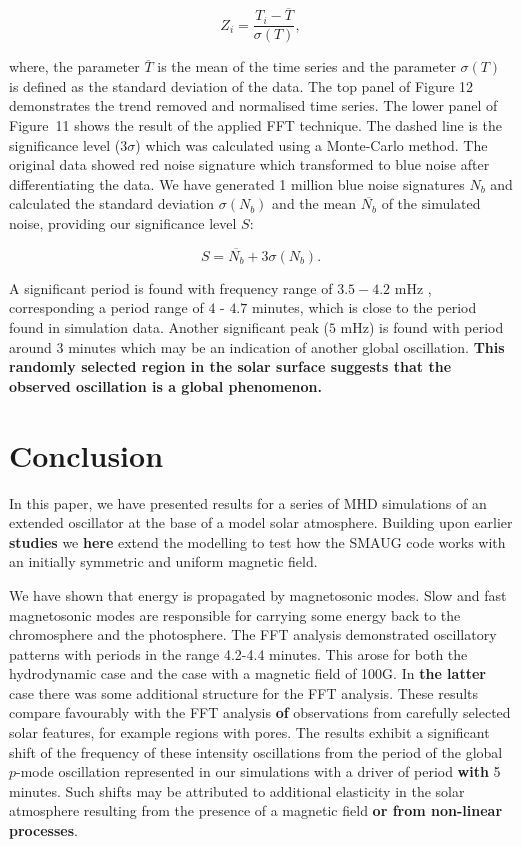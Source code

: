 \documentclass[physics,article,submit,pdftex,moreauthors]{Definitions/mdpi}
\begin{document}
\begin{equation}
	Z_{i} = \frac {T_{i} - \overline{T}}  {\sigma(T)},
	\label{z_score}
\end{equation}


where, the parameter $\overline{T}$ is the mean of the time series and the parameter $\sigma(T)$ is defined as the standard deviation of the data. The top panel of Figure 12 demonstrates the trend removed and normalised time series. The lower panel of Figure~11 shows the result of the applied FFT technique. The dashed line is the significance level ($3 \sigma$) which was calculated using a Monte-Carlo method. The original data showed red noise signature which transformed to blue noise after differentiating the data. We have generated 1 million blue noise signatures $N_{b}$ and calculated the standard deviation $\sigma(N_{b})$ and the mean $\overline{N_{b}}$ of the simulated noise, providing our significance level $S$:


\begin{equation}
    S = \overline{N_{b}} + 3 \sigma(N_{b}).
\end{equation}


A significant period is found with frequency range of $3.5-4.2$ mHz , corresponding a period range of $4$ - $4.7$ minutes, which is close to the period found in simulation data. Another significant peak ($5$ mHz) is found with period around $3$ minutes which may be an indication of another global oscillation. {\bf This randomly selected region in the solar surface suggests that the observed oscillation is a global phenomenon.}


\section{Conclusion}

In this paper, we have presented results for a series of MHD simulations of an extended oscillator at the base of a model solar atmosphere. Building upon earlier {\bf studies} we {\bf here} extend the modelling to test how the SMAUG code works with an initially symmetric and uniform magnetic field.

We have shown that energy is propagated by magnetosonic modes. Slow and fast magnetosonic modes are responsible for carrying some energy back to the chromosphere and the photosphere. 
The FFT analysis demonstrated oscillatory patterns with periods in the range 4.2-4.4 minutes. This arose for both the hydrodynamic case and the case with a magnetic field of 100G. In {\bf the latter} case there was some additional structure for the FFT analysis. These results compare favourably with the FFT analysis {\bf of} observations from carefully selected solar features, for example regions with pores. The results exhibit a significant shift of the frequency of these intensity oscillations from the period of the global $p$-mode oscillation represented in our simulations with a driver of period {\bf with} 5 minutes. Such shifts may be attributed to additional elasticity in the solar atmosphere resulting from the presence of a magnetic field {\bf or from non-linear processes}. 
\end{document}
